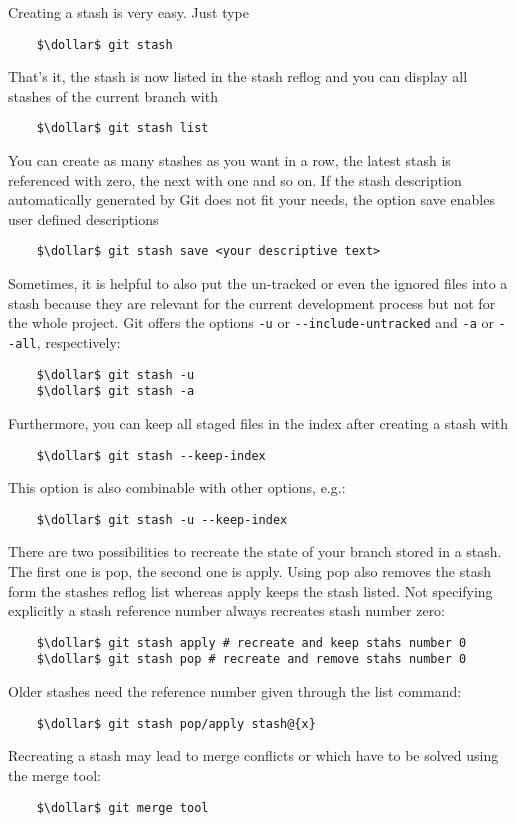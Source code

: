 Creating a stash is very easy. Just type 
\begin{lstlisting}
	$\dollar$ git stash
\end{lstlisting} 
That's it, the stash is now listed in the stash reflog and you can display all stashes of the current branch 
with 
\begin{lstlisting}
	$\dollar$ git stash list
\end{lstlisting} 
You can create as many stashes as you want in a row, the latest stash is referenced with zero, the next with one 
and so on.
If the stash description automatically generated by Git does not fit your needs, the option save enables user defined 
descriptions 
\begin{lstlisting}
	$\dollar$ git stash save <your descriptive text>
\end{lstlisting}
Sometimes, it is helpful to also put the un-tracked or even the ignored files into a stash because they are relevant 
for the current development process but not for the whole project. Git offers the options \verb|-u| or \verb|--include-untracked| and 
\verb|-a| or \verb|--all|, respectively:
\begin{lstlisting}
	$\dollar$ git stash -u 
	$\dollar$ git stash -a
\end{lstlisting}
Furthermore, you can keep all staged files in the index after creating a stash with
\begin{lstlisting} 
	$\dollar$ git stash --keep-index
\end{lstlisting}
This option is also combinable with other options, e.g.:
\begin{lstlisting} 
	$\dollar$ git stash -u --keep-index
\end{lstlisting}

There are two possibilities to recreate the state of your branch stored in a stash. The first one is pop, the second one
is apply. Using pop also removes the stash form the stashes reflog list whereas apply keeps the stash listed.
Not specifying explicitly a stash reference number always recreates stash number zero:
\begin{lstlisting}
	$\dollar$ git stash apply # recreate and keep stahs number 0 
	$\dollar$ git stash pop # recreate and remove stahs number 0
\end{lstlisting}
Older stashes need the reference number given through the list command:
\begin{lstlisting}
	$\dollar$ git stash pop/apply stash@{x}
\end{lstlisting}
Recreating a stash may lead to merge conflicts or which have to be solved using the merge tool:
\begin{lstlisting}
	$\dollar$ git merge tool 
\end{lstlisting}




